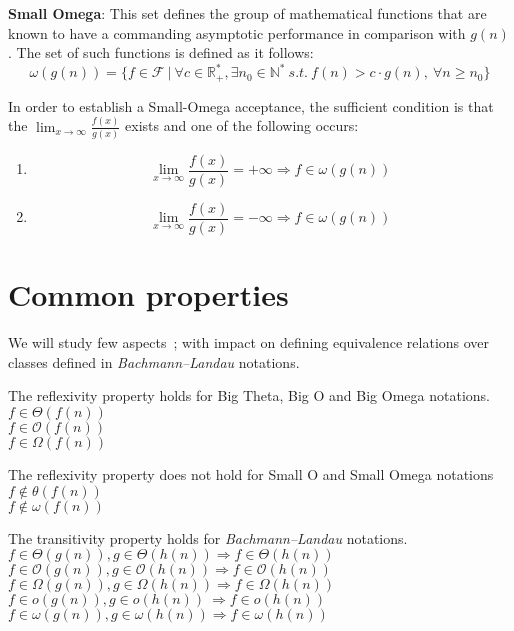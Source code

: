 \begin{definition}
    \textbf{Small Omega}:
    This set defines the group of mathematical functions that are known to have a commanding asymptotic performance in comparison with  $g(n)$.
    The set of such functions is defined as it follows:
    \[\omega(g(n)) = \lbrace f \in \mathcal{F}\ |\ \forall c \in \mathbb{R}^{*}_{+}, \exists n_{0} \in \mathbb{N}^{*}\ s.t.\  f(n) > c \cdot g(n),\  \forall n \geq n_{0} \rbrace\]
\end{definition}
\begin{lemma}
    In order to establish a Small-Omega acceptance, the sufficient condition is that the $ \lim_{x\to\infty} \frac{f(x)}{g(x)}$ exists and one of the following occurs:
    \begin{enumerate}[label=(\roman*)]
        \item \[  \lim_{x\to\infty} \frac{f(x)}{g(x)} = +\infty \Rightarrow f \in \omega(g(n))\ \]
        \item  \[  \lim_{x\to\infty} \frac{f(x)}{g(x)} = -\infty \Rightarrow f \in \omega(g(n))\ \]
    \end{enumerate}
\end{lemma}


\section{Common properties}
We will study few aspects~\cite{mogocs2015new};
with impact on defining equivalence relations over classes defined in \textit{Bachmann–Landau} notations.
\hfill\break
\begin{theorem}
    The reflexivity property holds for Big Theta, Big O and Big Omega notations.  \\  $ f \in \Theta(f(n)) $ \\$ f \in \mathcal{O}(f(n)) $ \\$ f \in \Omega(f(n)) $
\end{theorem}

\begin{remark}
    The reflexivity property does not hold for Small O and Small Omega notations \\
    $ f \notin \theta(f(n)) $ \\$ f \notin \omega(f(n)) $
\end{remark}

\begin{theorem}
    The transitivity property holds for \textit{Bachmann–Landau} notations.  \\  $ f \in \Theta(g(n)), g \in \Theta(h(n)) \Rightarrow  f \in \Theta(h(n))$ \\
    $ f \in \mathcal{O}(g(n)), g \in \mathcal{O}(h(n)) \Rightarrow  f \in \mathcal{O}(h(n))$ \\
    $ f \in \Omega(g(n)), g \in \Omega(h(n)) \Rightarrow  f \in \Omega(h(n))$ \\
    $ f \in o(g(n)), g \in o(h(n)) \  \Rightarrow  f \in o(h(n))$ \\
    $ f \in \omega(g(n)), g \in \omega(h(n)) \Rightarrow  f \in \omega(h(n))$
\end{theorem}

